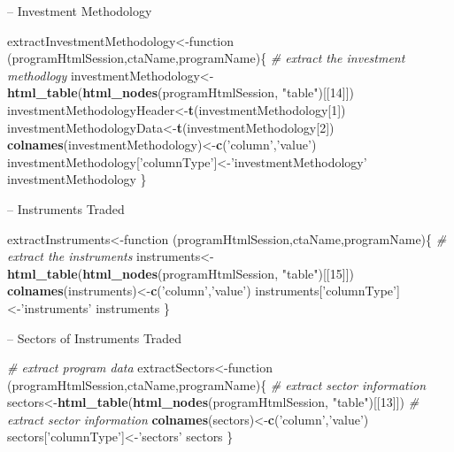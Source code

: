 \documentclass[]{article}
\newenvironment{Shaded}{\begin{snugshade}}{\end{snugshade}}
\newcommand{\KeywordTok}[1]{\textcolor[rgb]{0.13,0.29,0.53}{\textbf{{#1}}}}
\newcommand{\DecValTok}[1]{\textcolor[rgb]{0.00,0.00,0.81}{{#1}}}
\newcommand{\StringTok}[1]{\textcolor[rgb]{0.31,0.60,0.02}{{#1}}}
\newcommand{\CommentTok}[1]{\textcolor[rgb]{0.56,0.35,0.01}{\textit{{#1}}}}
\newcommand{\NormalTok}[1]{{#1}}
\begin{document}
-- Investment Methodology

\begin{Shaded}
\begin{Highlighting}[]
\NormalTok{extractInvestmentMethodology<-function (programHtmlSession,ctaName,programName)\{ }
  \CommentTok{# extract the investment methodlogy}
  \NormalTok{investmentMethodology<-}\KeywordTok{html_table}\NormalTok{(}\KeywordTok{html_nodes}\NormalTok{(programHtmlSession,}
    \StringTok{"table"}\NormalTok{)[[}\DecValTok{14}\NormalTok{]])}
  \NormalTok{investmentMethodologyHeader<-}\KeywordTok{t}\NormalTok{(investmentMethodology[}\DecValTok{1}\NormalTok{])}
  \NormalTok{investmentMethodologyData<-}\KeywordTok{t}\NormalTok{(investmentMethodology[}\DecValTok{2}\NormalTok{])}
  \KeywordTok{colnames}\NormalTok{(investmentMethodology)<-}\KeywordTok{c}\NormalTok{(}\StringTok{'column'}\NormalTok{,}\StringTok{'value'}\NormalTok{)}
  \NormalTok{investmentMethodology[}\StringTok{'columnType'}\NormalTok{]<-}\StringTok{'investmentMethodology'}
  \NormalTok{investmentMethodology}
\NormalTok{\}}
\end{Highlighting}
\end{Shaded}

-- Instruments Traded

\begin{Shaded}
\begin{Highlighting}[]
\NormalTok{extractInstruments<-function (programHtmlSession,ctaName,programName)\{}
  \CommentTok{# extract the instruments}
  \NormalTok{instruments<-}\KeywordTok{html_table}\NormalTok{(}\KeywordTok{html_nodes}\NormalTok{(programHtmlSession, }
    \StringTok{"table"}\NormalTok{)[[}\DecValTok{15}\NormalTok{]])  }
  \KeywordTok{colnames}\NormalTok{(instruments)<-}\KeywordTok{c}\NormalTok{(}\StringTok{'column'}\NormalTok{,}\StringTok{'value'}\NormalTok{)}
  \NormalTok{instruments[}\StringTok{'columnType'}\NormalTok{]<-}\StringTok{'instruments'}
  \NormalTok{instruments}
\NormalTok{\}}
\end{Highlighting}
\end{Shaded}

-- Sectors of Instruments Traded

\begin{Shaded}
\begin{Highlighting}[]
\CommentTok{# extract program data}
\NormalTok{extractSectors<-function (programHtmlSession,ctaName,programName)\{  }
  \CommentTok{# extract sector information}
  \NormalTok{sectors<-}\KeywordTok{html_table}\NormalTok{(}\KeywordTok{html_nodes}\NormalTok{(programHtmlSession,}
    \StringTok{"table"}\NormalTok{)[[}\DecValTok{13}\NormalTok{]])  }
  \CommentTok{# extract sector information}
  \KeywordTok{colnames}\NormalTok{(sectors)<-}\KeywordTok{c}\NormalTok{(}\StringTok{'column'}\NormalTok{,}\StringTok{'value'}\NormalTok{)}
  \NormalTok{sectors[}\StringTok{'columnType'}\NormalTok{]<-}\StringTok{'sectors'}
  \NormalTok{sectors}
\NormalTok{\}}
\end{Highlighting}
\end{Shaded}
\end{document}
